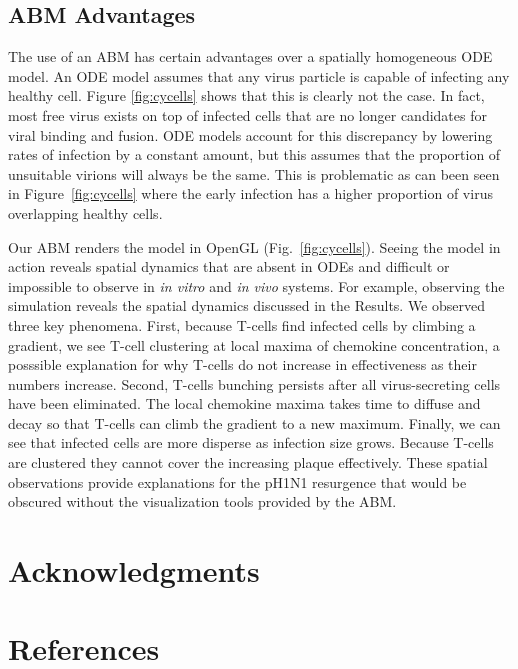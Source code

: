 \documentclass[10pt]{article}
\begin{document}
\subsection*{ABM Advantages}

The use of an ABM has certain advantages over a spatially homogeneous ODE model.  An ODE model assumes that any virus particle is capable of infecting any healthy cell.  Figure \ref{fig:cycells} shows that this is clearly not the case.  In fact, most free virus exists on top of infected cells that are no longer candidates for viral binding and fusion.  ODE models account for this discrepancy by lowering rates of infection by a constant amount, but this assumes that the proportion of unsuitable virions will always be the same.  This is problematic as can been seen in Figure~\ref{fig:cycells} where the early infection has a higher proportion of virus overlapping healthy cells.

Our ABM renders the model in OpenGL (Fig.~\ref{fig:cycells}).  Seeing the model in action reveals spatial dynamics that are absent in ODEs and difficult or impossible to observe in \textit{in vitro} and \textit{in vivo} systems.  For example, observing the simulation reveals the spatial dynamics discussed in the Results.  We observed three key phenomena.  First, because T-cells find infected cells by climbing a gradient, we see T-cell clustering at local maxima of chemokine concentration, a posssible explanation for why T-cells do not increase in effectiveness as their numbers increase.  Second, T-cells bunching persists after all virus-secreting cells have been eliminated.  The local chemokine maxima takes time to diffuse and decay so that T-cells can climb the gradient to a new maximum.  Finally, we can see that infected cells are more disperse as infection size grows.  Because T-cells are clustered they cannot cover the increasing plaque effectively.  These spatial observations provide explanations for the pH1N1 resurgence that would be obscured without the visualization tools provided by the ABM.

\section*{Acknowledgments}


\section*{References}

\end{document}
